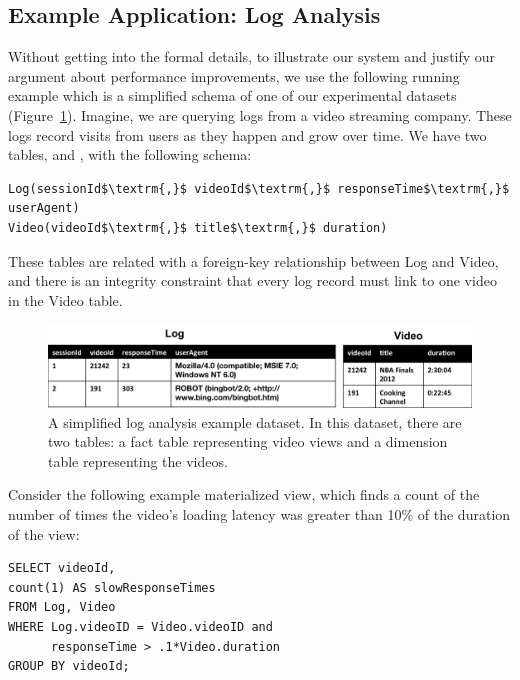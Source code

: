 \subsection{Example Application: Log Analysis}
Without getting into the formal details, to illustrate our system and justify our argument about performance improvements, we use the following running example which is a 
simplified schema of one of our experimental datasets (Figure~\ref{example-1}).
Imagine, we are querying logs from a video streaming company. 
These logs record visits from users as they happen and grow over time.
We have two tables,  and , with the following schema:

\begin{lstlisting}[mathescape]
Log(sessionId$\textrm{,}$ videoId$\textrm{,}$ responseTime$\textrm{,}$ userAgent)
Video(videoId$\textrm{,}$ title$\textrm{,}$ duration)
\end{lstlisting}
These tables are related with a foreign-key relationship between
Log and Video, and there is an integrity constraint that every log
record must link to one video in the Video table.

\begin{figure}[ht!] 
\centering
\vspace{-0.75em}
 \includegraphics[width=\columnwidth]{figs/sample-clean-example.png}\vspace{-0.25em}
 \caption{A simplified log analysis example dataset. In this dataset, there are two tables: a fact table representing video views and a dimension table representing the videos.\label{example-1}}
\end{figure}

Consider the following example materialized view, which finds a count of the number of times the video's loading latency was greater than 10\% of the duration of the view:

\vspace{0.5em}

\begin{lstlisting} 
SELECT videoId, 
count(1) AS slowResponseTimes 
FROM Log, Video
WHERE Log.videoID = Video.videoID and
	  responseTime > .1*Video.duration
GROUP BY videoId;
\end{lstlisting}

